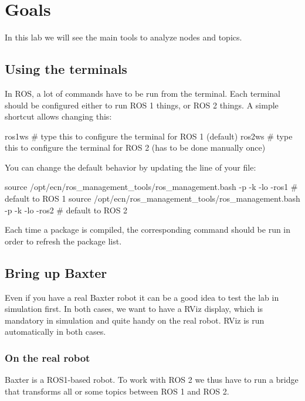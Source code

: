 \documentclass{ecnreport}
\author{O. Kermorgant}
\begin{document}


\section{Goals}

In this lab we will see the main tools to analyze nodes and topics.

\subsection{Using the terminals}

In ROS, a lot of commands have to be run from the terminal. Each terminal should be configured either to run ROS 1 things, or ROS 2 things.
A simple shortcut allows changing this:
\begin{bashcodelarge}
ros1ws  # type this to configure the terminal for ROS 1 (default)
ros2ws  # type this to configure the terminal for ROS 2 (has to be done manually once)
\end{bashcodelarge}

You can change the default behavior by updating the line of your  file:
\begin{bashcode}
 source /opt/ecn/ros_management_tools/ros_management.bash -p -k -lo -ros1 # default to ROS 1
 source /opt/ecn/ros_management_tools/ros_management.bash -p -k -lo -ros2 # default to ROS 2
\end{bashcode}


Each time a package is compiled, the corresponding command  should be run in order to refresh the package list.

\subsection{Bring up Baxter}

Even if you have a real Baxter robot it can be a good idea to test the lab in simulation first.
In both cases, we want to have a RViz display, which is mandatory in simulation and quite handy on the real robot. RViz is run automatically in both cases.

\subsubsection{On the real robot}

Baxter is a ROS1-based robot. To work with ROS 2 we thus have to run a bridge that transforms all or some topics between ROS 1 and ROS 2.
\end{document}
